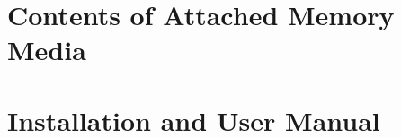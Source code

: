 

\chapter{Contents of Attached Memory Media}
\label{chap:memoryMedia}




\chapter{Installation and User Manual}
\label{chap:manual}




